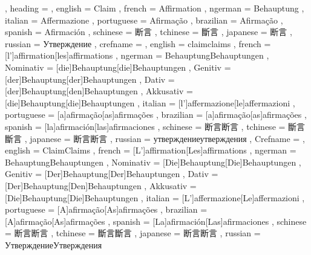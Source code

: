   {
    , heading =   {
                    , english     = Claim
                    , french      = Affirmation
                    , ngerman     = Behauptung
                    , italian     = Affermazione
                    , portuguese  = Afirmação
                    , brazilian   = Afirmação
                    , spanish     = Afirmación
                    , schinese    = 断言
                    , tchinese    = 斷言
                    , japanese    = 断言
                    , russian     = Утверждение
                  }
    , crefname =  {
                    , english     = {claim}{claims}
                    , french      = [l']{affirmation}[les]{affirmations}
                    , ngerman     = { {Behauptung}{Behauptungen}
                                      , Nominativ = [die]{Behauptung}[die]{Behauptungen}
                                      , Genitiv   = [der]{Behauptung}[der]{Behauptungen}
                                      , Dativ     = [der]{Behauptung}[den]{Behauptungen}
                                      , Akkusativ = [die]{Behauptung}[die]{Behauptungen}
                                    }
                    , italian     = [l']{affermazione}[le]{affermazioni}
                    , portuguese  = [a]{afirmação}[as]{afirmações}
                    , brazilian   = [a]{afirmação}[as]{afirmações}
                    , spanish     = [la]{afirmación}[las]{afirmaciones}
                    , schinese    = {断言}{断言}
                    , tchinese    = {斷言}{斷言}
                    , japanese    = {断言}{断言}
                    , russian     = {утверждение}{утверждения}
                  }
    , Crefname =  {
                    , english     = {Claim}{Claims}
                    , french      = [L']{affirmation}[Les]{affirmations}
                    , ngerman     = { {Behauptung}{Behauptungen}
                                      , Nominativ = [Die]{Behauptung}[Die]{Behauptungen}
                                      , Genitiv   = [Der]{Behauptung}[Der]{Behauptungen}
                                      , Dativ     = [Der]{Behauptung}[Den]{Behauptungen}
                                      , Akkusativ = [Die]{Behauptung}[Die]{Behauptungen}
                                    }
                    , italian     = [L']{affermazione}[Le]{affermazioni}
                    , portuguese  = [A]{afirmação}[As]{afirmações}
                    , brazilian   = [A]{afirmação}[As]{afirmações}
                    , spanish     = [La]{afirmación}[Las]{afirmaciones}
                    , schinese    = {断言}{断言}
                    , tchinese    = {斷言}{斷言}
                    , japanese    = {断言}{断言}
                    , russian     = {Утверждение}{Утверждения}
                  }
  }

